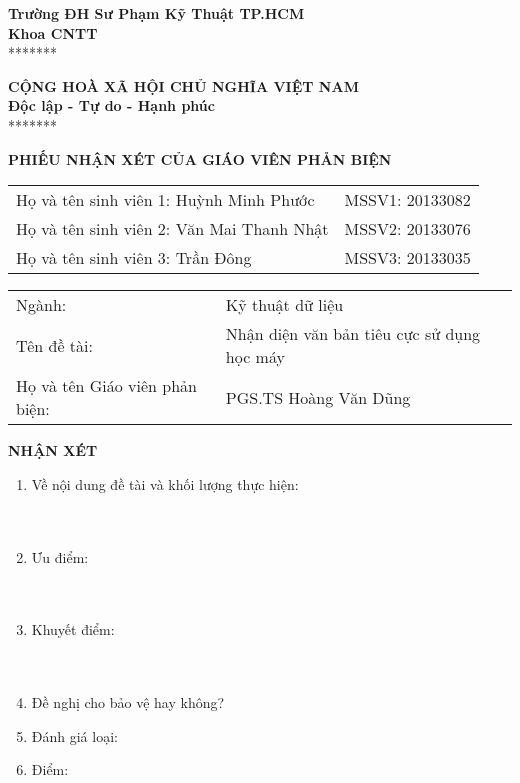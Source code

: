 %
\noindent\begin{minipage}[t]{0.43\textwidth}
    \centering
    \fontsize{11pt}{16.5pt}
    \textbf{Trường ĐH Sư Phạm Kỹ Thuật TP.HCM}\\
    \textbf{Khoa CNTT}\\
    *******
\end{minipage}
\begin{minipage}[t]{0.56\textwidth}
    \centering
    \fontsize{11pt}{16.5pt}
    \textbf{CỘNG HOÀ XÃ HỘI CHỦ NGHĨA VIỆT NAM}\\
    \textbf{Độc lập - Tự do - Hạnh phúc}\\
    *******
\end{minipage}
\begin{center}
    \fontsize{18pt}{27pt}
    \textbf{PHIẾU NHẬN XÉT CỦA GIÁO VIÊN PHẢN BIỆN}
\end{center}
\begin{table}[!h]
    \centering
    \begin{tabularx}{0.8\textwidth}{ X c }
        Họ và tên sinh viên 1: Huỳnh Minh Phước   & MSSV1: 20133082 \\
        Họ và tên sinh viên 2: Văn Mai Thanh Nhật & MSSV2: 20133076 \\
        Họ và tên sinh viên 3: Trần Đông          & MSSV3: 20133035 \\
    \end{tabularx}
\end{table}
\begin{center}
    \begin{tabular}{p{} p{}}
        Ngành:                         & Kỹ thuật dữ liệu                           \\
        Tên đề tài:                    & Nhận diện văn bản tiêu cực sử dụng học máy \\
        Họ và tên Giáo viên phản biện: & PGS.TS Hoàng Văn Dũng
    \end{tabular}
\end{center}
\textbf{NHẬN XÉT}
\begin{enumerate}
    \item Về nội dung đề tài và khối lượng thực hiện:\\
          \mbox{}\dotfill\\
          \mbox{}\dotfill\\
          \mbox{}\dotfill
    \item Ưu điểm:\\
          \mbox{}\dotfill\\
          \mbox{}\dotfill\\
          \mbox{}\dotfill
    \item Khuyết điểm:\\
          \mbox{}\dotfill\\
          \mbox{}\dotfill\\
          \mbox{}\dotfill
    \item Đề nghị cho bảo vệ hay không?
    \item Đánh giá loại:
    \item Điểm:
\end{enumerate}
